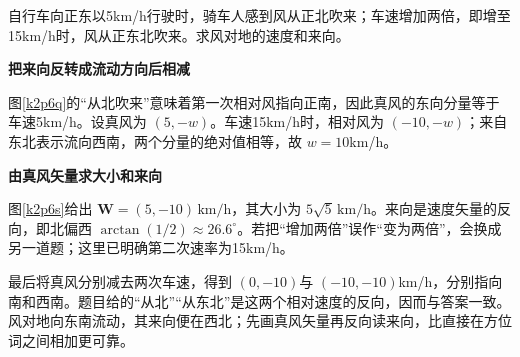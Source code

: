 \begin{question}\begin{example}[骑行者看到的风向]\label{k2p6}
自行车向正东以5km/h行驶时，骑车人感到风从正北吹来；车速增加两倍，即增至15km/h时，风从正东北吹来。求风对地的速度和来向。\end{example}
\end{question}
\begin{solution}\textbf{把来向反转成流动方向后相减}\par\nobreak
图\ref{k2p6q}的“从北吹来”意味着第一次相对风指向正南，因此真风的东向分量等于车速5km/h。设真风为 $(5,-w)$。车速15km/h时，相对风为 $(-10,-w)$；来自东北表示流向西南，两个分量的绝对值相等，故 $w=10$km/h。



\par\medskip{}\noindent\textbf{由真风矢量求大小和来向}\par\nobreak
图\ref{k2p6s}给出 $\boxed{\bm W=(5,-10)\,\mathrm{km/h}}$，其大小为 $\boxed{5\sqrt5\,\mathrm{km/h}}$。来向是速度矢量的反向，即北偏西 $\arctan(1/2)\approx26.6^\circ$。若把“增加两倍”误作“变为两倍”，会换成另一道题；这里已明确第二次速率为15km/h。

最后将真风分别减去两次车速，得到 $(0,-10)$与 $(-10,-10)$km/h，分别指向南和西南。题目给的“从北”“从东北”是这两个相对速度的反向，因而与答案一致。风对地向东南流动，其来向便在西北；先画真风矢量再反向读来向，比直接在方位词之间相加更可靠。\end{solution}

